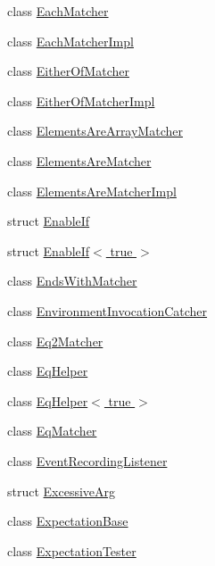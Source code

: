 \begin{DoxyCompactItemize}
\item 
class \hyperlink{classtesting_1_1internal_1_1_each_matcher}{Each\+Matcher}
\item 
class \hyperlink{classtesting_1_1internal_1_1_each_matcher_impl}{Each\+Matcher\+Impl}
\item 
class \hyperlink{classtesting_1_1internal_1_1_either_of_matcher}{Either\+Of\+Matcher}
\item 
class \hyperlink{classtesting_1_1internal_1_1_either_of_matcher_impl}{Either\+Of\+Matcher\+Impl}
\item 
class \hyperlink{classtesting_1_1internal_1_1_elements_are_array_matcher}{Elements\+Are\+Array\+Matcher}
\item 
class \hyperlink{classtesting_1_1internal_1_1_elements_are_matcher}{Elements\+Are\+Matcher}
\item 
class \hyperlink{classtesting_1_1internal_1_1_elements_are_matcher_impl}{Elements\+Are\+Matcher\+Impl}
\item 
struct \hyperlink{structtesting_1_1internal_1_1_enable_if}{Enable\+If}
\item 
struct \hyperlink{structtesting_1_1internal_1_1_enable_if_3_01true_01_4}{Enable\+If$<$ true $>$}
\item 
class \hyperlink{classtesting_1_1internal_1_1_ends_with_matcher}{Ends\+With\+Matcher}
\item 
class \hyperlink{classtesting_1_1internal_1_1_environment_invocation_catcher}{Environment\+Invocation\+Catcher}
\item 
class \hyperlink{classtesting_1_1internal_1_1_eq2_matcher}{Eq2\+Matcher}
\item 
class \hyperlink{classtesting_1_1internal_1_1_eq_helper}{Eq\+Helper}
\item 
class \hyperlink{classtesting_1_1internal_1_1_eq_helper_3_01true_01_4}{Eq\+Helper$<$ true $>$}
\item 
class \hyperlink{classtesting_1_1internal_1_1_eq_matcher}{Eq\+Matcher}
\item 
class \hyperlink{classtesting_1_1internal_1_1_event_recording_listener}{Event\+Recording\+Listener}
\item 
struct \hyperlink{structtesting_1_1internal_1_1_excessive_arg}{Excessive\+Arg}
\item 
class \hyperlink{classtesting_1_1internal_1_1_expectation_base}{Expectation\+Base}
\item 
class \hyperlink{classtesting_1_1internal_1_1_expectation_tester}{Expectation\+Tester}
\item 

\end{DoxyCompactItemize}
